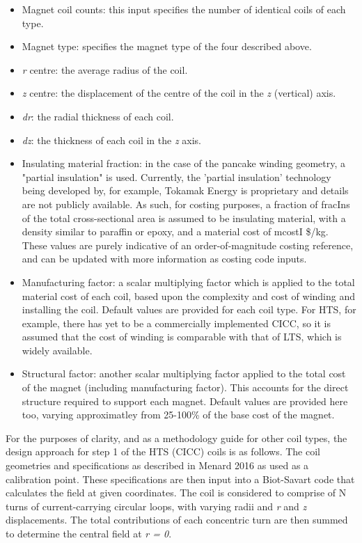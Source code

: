 \begin{itemize}
    \item Magnet coil counts: this input specifies the number of identical coils of each type.
    \item Magnet type: specifies the magnet type of the four described above.
    \item \textit{r} centre: the average radius of the coil.
    \item \textit{z} centre: the displacement of the centre of the coil in the \textit{z} (vertical) axis.
    \item \textit{dr}: the radial thickness of each coil.
    \item \textit{dz}: the thickness of each coil in the \textit{z} axis.
    \item Insulating material fraction: in the case of the pancake winding geometry, a "partial insulation" is used. Currently, the 'partial insulation' technology being developed by, for example, Tokamak Energy is proprietary and details are not publicly available. As such, for costing purposes, a fraction of fracIns of the total cross-sectional area is assumed to be insulating material, with a density similar to paraffin or epoxy, and a material cost of mcostI \$/kg. These values are purely indicative of an order-of-magnitude costing reference, and can be updated with more information as costing code inputs.
    \item Manufacturing factor: a scalar multiplying factor which is applied to the total material cost of each coil, based upon the complexity and cost of winding and installing the coil. Default values are provided for each coil type. For HTS, for example, there has yet to be a commercially implemented CICC, so it is assumed that the cost of winding is comparable with that of LTS, which is widely available.
    \item Structural factor: another scalar multiplying factor applied to the total cost of the magnet (including manufacturing factor). This accounts for the direct structure required to support each magnet. Default values are provided here too, varying approximatley from 25-100\% of the base cost of the magnet.
\end{itemize}

For the purposes of clarity, and as a methodology guide for other coil types, the design approach for step 1 of the HTS (CICC) coils is as follows. The coil geometries and specifications as described in Menard 2016 \cite{Menard2016} as used as a calibration point. These specifications are then input into a Biot-Savart code that calculates the field at given coordinates. The coil is considered to comprise of N turns of current-carrying circular loops, with varying radii and \textit{r} and \textit{z} displacements. The total contributions of each concentric turn are then summed to determine the central field at \textit{r = 0}.\\


